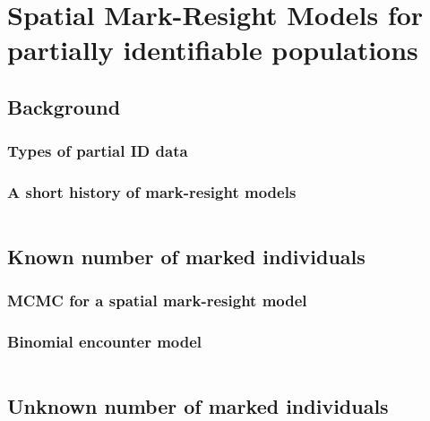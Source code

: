 \chapter{
Spatial Mark-Resight Models for partially identifiable
populations
}
\label{chapt.partialID}



\section{Background}
\subsection{Types of partial ID data}



\subsection{A short history of mark-resight models}


\begin{equation}
\end{equation}
\label{partialID.eq.E_n}

\section{Known number of marked individuals}

\subsection{MCMC for a spatial mark-resight model}


\subsection{Binomial encounter model}

\begin{table}
\label{partialID.tab.geese}
\centering
   \begin{tabular}{lccccc}
    \end{tabular}
\end{table}

\begin{figure}[ht]
  \centering
  \label{partialID.fig.geese}
\end{figure}

\section {Unknown number of marked individuals}

